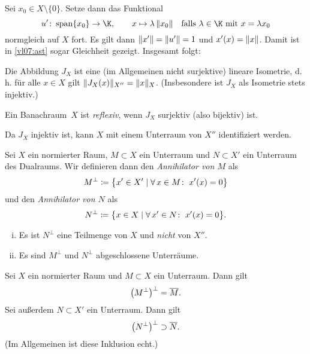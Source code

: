 Sei $x_0\in X\setminus\{0\}$. Setze dann das Funktional
\[ u'\colon \spann\{x_0\} \to \K, \qquad 
    x \mapsto \lambda\,\norm{x_0} 
    \text{\quad falls $\lambda\in\K$ mit $x=\lambda x_0$}
\]
normgleich auf $X$ fort.
Es gilt dann $\lVert x'\rVert = \lVert u'\rVert = 1$ und $x'(x) = \lVert x\rVert$. Damit ist
in \eqref{vl07:ast} sogar Gleichheit gezeigt. Insgesamt folgt:
\begin{thSatz}
    Die Abbildung $J_X$ ist eine (im Allgemeinen nicht surjektive) lineare
    Isometrie, d.\,h. für alle $x\in X$ gilt $\lVert J_X(x)\rVert_{X''} 
    = \lVert x\rVert_X$. (Insbesondere ist $J_X$ als Isometrie stets injektiv.)
\end{thSatz}

\begin{thDef}
    Ein Banachraum~$X$ ist \emph{reflexiv}, wenn $J_X$ surjektiv (also
    bijektiv) ist.
\end{thDef}

\nnBemerkung \label{vl07:bemJX}
Da $J_X$ injektiv ist, kann $X$ mit einem Unterraum von $X''$ identifiziert
werden.

\begin{thDef}
    Sei $X$ ein normierter Raum, $M\subset X$ ein Unterraum und $N\subset X'$
    ein Unterraum des Dualraums.
    Wir definieren dann den \emph{Annihilator von $M$} als
    \[ M^\perp \defeq \bigl\{ x'\in X' \Mid 
        \forall\,x\in M\colon\; x'(x) = 0\bigr\}  \]
    und den \emph{Annihilator von $N$} als
    \[ N^\perp \defeq \bigl\{ x\in X \Mid 
        \forall\,x'\in N\colon\; x'(x) = 0 \bigr\}
    . \]
\end{thDef}

\begin{thBemerkung}\hfill
    \begin{enumerate}[i)]
        \item 
            Es ist $N^\perp$ eine Teilmenge von $X$ und \emph{nicht} 
            von $X''$.
        \item
            Es sind $M^\perp$ und $N^\perp$ abgeschlossene Unterräume.
    \end{enumerate}
\end{thBemerkung}

\begin{thSatz}
    Sei $X$ ein normierter Raum und $M\subset X$ ein Unterraum. Dann gilt
    \[ \bigl(M^\perp\bigr)^\perp = \overline{M}  . \] 
    Sei außerdem $N\subset X'$ ein Unterraum.  Dann gilt 
    \[ \bigl(N^\perp\bigr)^\perp \supset \overline{N}  . \]
    (Im Allgemeinen ist diese Inklusion echt.)
\end{thSatz}

